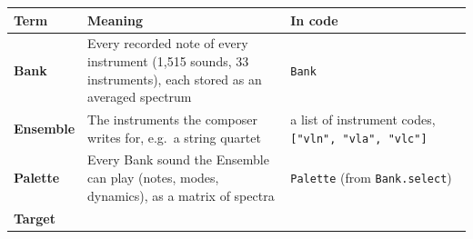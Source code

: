 \documentclass[
  10pt,
]{article}
\begin{document}
\begin{longtable}[]{@{}lll@{}}
\toprule
\begin{minipage}[b]{0.30\columnwidth}\raggedright
Term\strut
\end{minipage} &
\begin{minipage}[b]{0.30\columnwidth}\raggedright
Meaning\strut
\end{minipage} &
\begin{minipage}[b]{0.30\columnwidth}\raggedright
In code\strut
\end{minipage}\tabularnewline
\midrule
\endhead
\begin{minipage}[t]{0.30\columnwidth}\raggedright
\textbf{Bank}\strut
\end{minipage} &
\begin{minipage}[t]{0.30\columnwidth}\raggedright
Every recorded note of every instrument (1,515 sounds, 33
instruments), each stored as an averaged spectrum\strut
\end{minipage} &
\begin{minipage}[t]{0.30\columnwidth}\raggedright
\texttt{Bank}\strut
\end{minipage}\tabularnewline
\begin{minipage}[t]{0.30\columnwidth}\raggedright
\textbf{Ensemble}\strut
\end{minipage} &
\begin{minipage}[t]{0.30\columnwidth}\raggedright
The instruments the composer writes for, e.g.~a string
quartet\strut
\end{minipage} &
\begin{minipage}[t]{0.30\columnwidth}\raggedright
a list of instrument codes,
\texttt{{[}"vln",\ "vla",\ "vlc"{]}}\strut
\end{minipage}\tabularnewline
\begin{minipage}[t]{0.30\columnwidth}\raggedright
\textbf{Palette}\strut
\end{minipage} &
\begin{minipage}[t]{0.30\columnwidth}\raggedright
Every Bank sound the Ensemble can play (notes, modes,
dynamics), as a matrix of spectra\strut
\end{minipage} &
\begin{minipage}[t]{0.30\columnwidth}\raggedright
\texttt{Palette} (from \texttt{Bank.select})\strut
\end{minipage}\tabularnewline
\begin{minipage}[t]{0.30\columnwidth}\raggedright
\textbf{Target}\strut
\end{minipage} &

\end{longtable}
\end{document}

